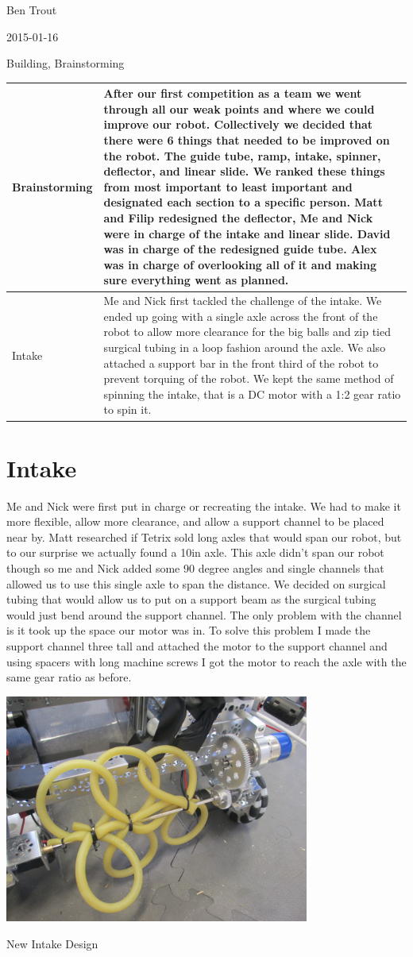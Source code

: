 Ben Trout

2015-01-16

Building, Brainstorming

\begin{tabular}{|p{5cm}|p{5cm}|}
\hline
Brainstorming&
After our first competition as a team we went through all our weak points and where we could improve our robot. Collectively we decided that there were 6 things that needed to be improved on the robot. The guide tube, ramp, intake, spinner, deflector, and linear slide. We ranked these things from most important to least important and designated each section to a specific person. Matt and Filip redesigned the deflector, Me and Nick were in charge of the intake and linear slide. David was in charge of the redesigned guide tube. Alex was in charge of overlooking all of it and making sure everything went as planned.
\\
\hline
Intake&
Me and Nick first tackled the challenge of the intake. We ended up going with a single axle across the front of the robot to allow more clearance for the big balls and zip tied surgical tubing in a loop fashion around the axle. We also attached a support bar in the front third of the robot to prevent torquing of the robot. We kept the same method of spinning the intake, that is a DC motor with a 1:2 gear ratio to spin it.
\\
\hline
\end{tabular}

\section*{Intake}
Me and Nick were first put in charge or recreating the intake. We had to make it more flexible, allow more clearance, and allow a support channel to be placed near by. Matt researched if Tetrix sold long axles that would span our robot, but to our surprise we actually found a 10in axle. This axle didn’t span our robot though so me and Nick added some 90 degree angles and single channels that allowed us to use this single axle to span the distance. We decided on surgical tubing that would allow us to put on a support beam as the surgical tubing would just bend around the support channel. The only problem with the channel is it took up the space our motor was in. To solve this problem I made the support channel three tall and attached the motor to the support channel and using spacers with long machine screws I got the motor to reach the axle with the same gear ratio as before.

\begin{center}
\includegraphics[width=10cm]{./Entries/Images/SurgicalIntake.jpg}
\end{center}

New Intake Design
